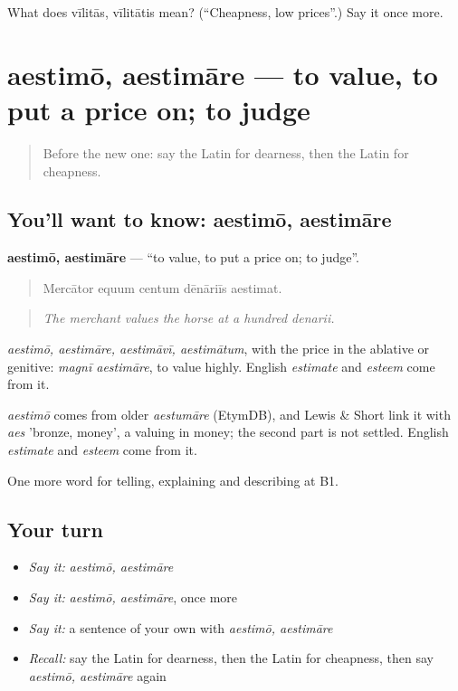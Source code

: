 \begin{tcolorbox}[breakable,colback=teal!4,colframe=teal!35!black,title={Before you move on}]
What does vīlitās, vīlitātis mean? (\textquotedblleft{}Cheapness, low prices\textquotedblright{}.) Say it once more.
\end{tcolorbox}
\section[aestimō, aestimāre]{aestimō, aestimāre — to value, to put a price on; to judge}

\label{lesson:LA-C466-aestimo}



\begin{quote}
Before the new one: say the Latin for dearness, then the Latin for cheapness.
\end{quote}

\subsection*{You'll want to know: aestimō, aestimāre}
\textbf{aestimō, aestimāre} — \textquotedblleft{}to value, to put a price on; to judge\textquotedblright{}.

\begin{quote}
Mercātor equum centum dēnāriīs aestimat.
\end{quote}

\begin{quote}
\emph{The merchant values the horse at a hundred denarii.}
\end{quote}

\emph{aestimō, aestimāre, aestimāvī, aestimātum}, with the price in the ablative or genitive: \emph{magnī aestimāre}, to value highly. English \emph{estimate} and \emph{esteem} come from it.

\begin{cousinweb}
\emph{aestimō} comes from older \emph{aestumāre} (EtymDB), and Lewis \& Short link it with \emph{aes} 'bronze, money', a valuing in money; the second part is not settled. English \emph{estimate} and \emph{esteem} come from it.
\end{cousinweb}

\begin{grammarlens}[title={What you've built}]
One more word for telling, explaining and describing at B1.
\end{grammarlens}

\subsection*{Your turn}
\begin{itemize}
\raggedright
  \item \emph{Say it:} \emph{aestimō, aestimāre}
  \item \emph{Say it:} \emph{aestimō, aestimāre}, once more
  \item \emph{Say it:} a sentence of your own with \emph{aestimō, aestimāre}
  \item \emph{Recall:} say the Latin for dearness, then the Latin for cheapness, then say \emph{aestimō, aestimāre} again
\end{itemize}

